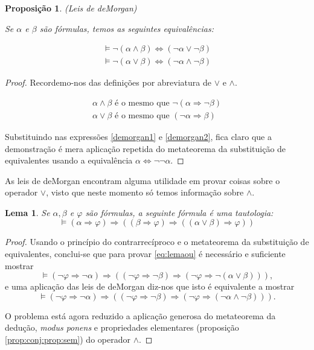 \documentclass{report}
\newtheorem{prop}{Proposição}
\newtheorem{lema}{Lema}
\theoremstyle{definition}
\theoremstyle{remark}
\newcommand{\imply}{\mathbin{\Rightarrow}}
\newcommand{\eqv}{\mathbin{\Leftrightarrow}}
\begin{document}
	\begin{prop}\label{demorgan}
	(Leis de deMorgan)
	
	Se $\alpha$ e $\beta$ são fórmulas, temos as seguintes equivalências:
	
	\begin{gather}
	\vDash \neg (\alpha \land \beta) \eqv (\neg \alpha \lor \neg \beta)\label{demorgan1}\\
	\vDash \neg (\alpha \lor \beta) \eqv (\neg \alpha \land \neg \beta)\label{demorgan2}
	\end{gather}
	\end{prop}
	
	\begin{proof}
	Recordemo-nos das definições por abreviatura de $\lor$ e $\land$.
	
	\begin{gather}
	\alpha \land \beta \text{ é o mesmo que } \neg (\alpha \imply \neg \beta)\\
	\alpha \lor \beta \text{ é o mesmo que } (\neg \alpha \imply \beta)
	\end{gather}
	
	Substituindo nas expressões \eqref{demorgan1} e \eqref{demorgan2}, fica claro que a demonstração é mera aplicação repetida do metateorema da substituição de equivalentes usando a equivalência $\alpha \eqv \neg \neg \alpha$.
	\end{proof}
	
	As leis de deMorgan encontram alguma utilidade em provar coisas sobre o operador $\lor$, visto que neste momento só temos informação sobre $\land$.
	
	\begin{lema}\label{lemaou}
	Se $\alpha, \beta$ e $\varphi$ são fórmulas, a seguinte fórmula é uma tautologia:
	\begin{equation}\label{eq:lemaou}
	\vDash (\alpha \imply \varphi) \imply ((\beta \imply \varphi) \imply ((\alpha \lor \beta) \imply \varphi))
	\end{equation}
	\end{lema}
	
	\begin{proof}
	Usando o princípio do contrarrecíproco e o metateorema da substituição de equivalentes, conclui-se que para provar \eqref{eq:lemaou} é necessário e suficiente mostrar
	\begin{equation}
	\vDash (\neg \varphi \imply \neg \alpha) \imply ((\neg \varphi \imply \neg \beta) \imply (\neg \varphi \imply \neg (\alpha \lor \beta))),
	\end{equation}
	e uma aplicação das leis de deMorgan diz-nos que isto é equivalente a mostrar
	\begin{equation}
	\vDash (\neg \varphi \imply \neg \alpha) \imply ((\neg \varphi \imply \neg \beta) \imply (\neg \varphi \imply (\neg \alpha \land \neg \beta))).
	\end{equation}
	
	O problema está agora reduzido a aplicação generosa do metateorema da dedução, \textit{modus ponens} e propriedades elementares (proposição \ref{prop:conj:prop:sem}) do operador $\land$.
	\end{proof}
	
\end{document}

